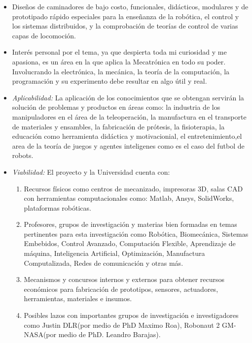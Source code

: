 \begin{itemize}
\item Dise\~nos de caminadores de bajo costo, funcionales, did\'acticos, modulares y de prototipado r\'apido especiales para la ense\~nanza de la rob\'otica, el control y los sistemas distribuidos, y la comprobaci\'on de teor\'ias de control de varias capas de locomoci\'on.
\item Inter\'es personal por el tema, ya que despierta toda mi curiosidad y me apasiona, es un \'area en la que aplica la Mecatr\'onica en todo su poder. Involucrando la electr\'onica, la mec\'anica, la teor\'ia de la computaci\'on, la programaci\'on y su experimento debe resultar en algo \'util y real\cite{Castillo2007,Castillo2008,Castillo2010}.
\item \emph{Aplicabilidad:} La aplicaci\'on de los conocimientos que se obtengan servir\'an la soluci\'on de problemas y productos en \'areas como: la industria de los manipuladores en el \'area de la teleoperaci\'on\cite{Treesatayapun2014,M2013}, la manufactura en el transporte de materiales y ensambles\cite{Roy2013}, la fabricaci\'on de pr\'otesis\cite{Roa2006}, la fisioterapia\cite{Kang2013}, la educaci\'on como herramienta did\'actica y motivacionial\cite{Ishida2004}, el entretenimiento,el area de la teor\'ia de juegos y agentes inteligenes como es el caso del futbol de robots\cite{Ishida2004}.
\item \emph{Viabilidad:} El proyecto y la Universidad cuenta con: 
  \begin{enumerate}[1)]
  \item Recursos f\'isicos como centros de mecanizado, impresoras 3D, salas CAD con herramientas computacionales como: Matlab, Ansys, SolidWorks, plataformas rob\'oticas.
  \item Profesores, grupos de investigaci\'on y materias bien formadas en temas pertinentes para esta investigaci\'on como Rob\'otica, Biomec\'anica, Sistemas Embebidos, Control Avanzado, Computaci\'on Flexible, Aprendizaje de m\'aquina, Inteligencia Artificial, Optimizaci\'on, Manufactura Computalizada, Redes de comunicaci\'on y otras m\'as.
  \item  Mecanismos y concursos internos y externos para obtener recursos econ\'omicos para fabricaci\'on de prototipos, sensores, actuadores, herramientas, materiales e insumos.
  \item Posibles lazos con importantes grupos de investigaci\'on e investigadores como Justin DLR(por medio de PhD Maximo Roa), Robonaut 2 GM-NASA(por medio de PhD. Leandro Barajas).

\end{enumerate}
\end{itemize}
